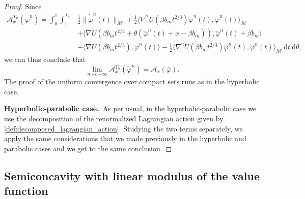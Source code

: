 \documentclass[a4paper,10pt]{amsart}
\newcommand{\ud}{\mathrm{d}}
\theoremstyle{plain}
\theoremstyle{definition}
\numberwithin{equation}{section}
\numberwithin{thm}{section}
\begin{document}
\begin{proof}
Since
\[
\begin{split}
\mathcal{A}_{x}^{T_n}(\tilde\varphi^n) = \int_{0}^{1}\int_{1}^{T_n}&\frac{1}{2}\|\dot{\tilde\varphi}^n(t)\|_\mathcal{M} + \frac{1}{2}\langle\nabla^2U(\beta b_mt^{2/3})\tilde\varphi^n(t),\tilde\varphi^n(t)\rangle_\mathcal{M} \\& +  \langle\nabla U(\beta b_m t^{2/3}+\theta (\tilde\varphi^n(t)+x-\beta b_m)),\tilde\varphi^n(t)+\beta b_m\rangle \\& - \langle\nabla U(\beta b_mt^{2/3}),\tilde\varphi^n(t)\rangle - \frac{1}{2}\langle\nabla^2U(\beta b_mt^{2/3})\tilde\varphi^n(t),\tilde\varphi^n(t)\rangle_\mathcal{M}\ \ud t\ \ud \theta,
\end{split}
\]
we can thus conclude that
\[
\lim_{n\rightarrow+\infty}\mathcal{A}_{x}^{T_n}(\tilde \varphi^n) = \mathcal{A}_{x}(\bar \varphi).
\]
The proof of the uniform convergence over compact sets runs as in the hyperbolic case.

\smallskip
\textbf{Hyperbolic-parabolic case.}\ As per usual, in the hyperbolic-parabolic case we use the decomposition of the renormalized Lagrangian action given by \eqref{def:decomposed_lagrangian_action}. Studying the two terms separately, we apply the same considerations that we made previously in the hyperbolic and parabolic cases and we get to the same conclusion.
\end{proof}

\subsection{Semiconcavity with linear modulus of the value function}\label{sez_semiconcavity}
\end{document}
